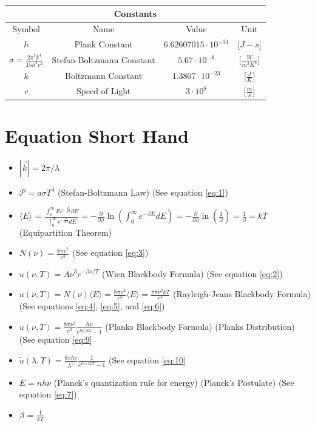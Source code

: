 \documentclass[10pt]{article}
\begin{document}
        \begin{table}
        \centering
            \begin{tabular}{|c|c|c|c|} \hline 
                \multicolumn{4}{|c|}{Constants}\\ \hline 
                Symbol  &   Name    &   Value   &   Unit\\ \hline 
                $h$     &   Plank Constant  &   $6.62607015 \cdot 10^{-34}$ &   [$J-s$]\\ \hline 
                $\sigma=\frac{2 \pi^5 k^4}{15 h^3 c^2}$&   Stefan-Boltzmann Constant   &   $5.67 \cdot 10^{-8}$    &   [$\frac{W}{m^2 K^4}$]\\ \hline 
                $k$     &   Boltzmann Constant  &   $1.3807 \cdot 10^{-23}$ &    [$\frac{J}{K}$]\\ \hline 
                $c$ &   Speed of Light  &   $3 \cdot 10^8$  &   [$\frac{m}{s}$]\\ \hline
            \end{tabular}
        \label{tab:const}
        \end{table}
        

\section{Equation Short Hand}
    \begin{itemize}
        \item $|\vec{k}| = 2 \pi / \lambda$
        \item $\mathcal{P} = a \sigma T^{4}$ (Stefan-Boltzmann Law) (See equation \ref{eq:1})
        \item $\langle E \rangle$ = $\frac{\int_0^\infty E e^{-\frac{E}{kT}}dE}{\int_0^\infty e^{-\frac{E}{kT}}dE} = -\frac{\partial}{\partial \beta} \ln \left(\int_{0}^{\infty} e^{-\beta E} d E\right) = -\frac{\partial}{\partial \beta} \ln (\frac{1}{\beta}) = \frac{1}{\beta} = kT$ (Equipartition Theorem) 
        \item $N(\nu)=\frac{8 \pi v^{2}}{c^{3}}$ (See equation \ref{eq:3})
        \item $u(\nu, T) = A \nu^{3} e^{-\beta \nu / T}$ (Wien Blackbody Formula) (See equation \ref{eq:2})
        \item $u(\nu, T)=N(\nu)\langle E\rangle=\frac{8 \pi \nu^{2}}{c^{3}}\langle E\rangle=\frac{8 \pi \nu^{2} kT}{c^{3}}$ (Rayleigh-Jeans Blackbody Formula) (See equations \ref{eq:4},  \ref{eq:5}, and \ref{eq:6})
        \item $u(\nu, T)=\frac{8 \pi \nu^{2}}{c^{3}} \frac{h \nu}{e^{h \nu / k T}-1}$ (Planks Blackbody Formula) (Planks Distribution) (See equation \ref{eq:9}
        \item $\tilde{u}(\lambda, T)=\frac{8 \pi h c}{\lambda^{5}} \frac{1}{e^{h c / \lambda k T}-1}$ (See equation \ref{eq:10}
        \item $E =n h \nu$ (Planck's quantization rule for energy) (Planck's Postulate) (See equation \ref{eq:7})
        \item $\beta$ = $\frac{1}{k T}$
    \end{itemize}
\end{document}
